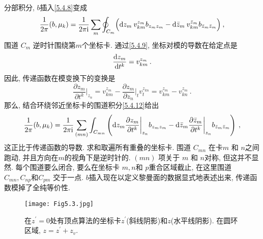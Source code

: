 分部积分, $b$插入\eqref{5.4.8}变成
\begin{equation}
	\frac{1}{2 \pi}(b, \mu_{k})=\frac{1}{2 \pi \mathrm{i}} \sum_{m} \oint_{C_{m}}\Bigl(\mathrm{d} z_{m} \: v_{k m}^{z_{m}} b_{z_{m} z_{m}}-\mathrm{d} \bar{z}_{m}\: v_{k m}^{\bar{z}_{m}} b_{\bar{z}_{m} \bar{z}_{m}}\Bigr) \:, \label{5.4.12}
\end{equation}
围道 $C_{m}$ 逆时针围绕第$m$个坐标卡. 通过\eqref{5.4.9}, 坐标对模的导数在给定点是
\begin{equation}
	\frac{\mathrm{d} z_{m}}{\mathrm{d} t^{k}}=v_{k m}^{z_{m}} \:. \label{5.4.13}
\end{equation}
因此, 传递函数在模变换下的变换是
\begin{equation}
	\frac{\partial z_{m}}{\partial t^{k}}\biggr|_{z_{n}}=v_{k m}^{z_{m}}-\frac{\partial z_{m}}{\partial z_{n}}\biggr\vert_{t} v_{t}^{z_{k n}}=v_{k m}^{z_{m}}-v_{k n}^{z_{m}} \:. \label{5.4.14}
\end{equation}
那么, 结合环绕邻近坐标卡的围道积分\eqref{5.4.12}给出
\begin{equation}
	\frac{1}{2 \pi}(b, \mu_{k}) = \frac{1}{2 \pi \mathrm{i}} \sum_{(m n)} \int_{C_{m n}}
	\left( \mathrm{d} z_{m} \frac{\partial z_{m}}{\partial t^{k}}\biggr\vert_{z_{n}} b_{z_{m} z_{m}}
	      -\mathrm{d} \bar{z}_{m} \frac{\partial \bar{z}_{m}}{\partial t^{k}}\biggr\vert_{z_{n}} b_{\bar{z}_{m} \bar{z}_{m}}\right)\:,
     \label{5.4.15}
\end{equation}
这正比于传递函数的导数. 求和取遍所有重叠的坐标卡. 围道 $C_{m n}$ 在卡$m$ 和 $n$之间跑动, 并且方向在$m$的视角下是逆时针的. 
$(m n)$ 项关于 $m$ 和 $n$对称, 但这并不显然. 每个围道要么闭合, 要么在坐标卡 $m, n$和 $p$重合区域截止, 
在这里围道 $C_{m n}, C_{n p}$和$C_{p m}$ 交于一点. $b$插入现在以定义黎曼面的数据显式地表述出来, 传递函数模掉了全纯等价性.

\begin{figure}
	\begin{center}
		\texttt{[image: Fig5.3.jpg]}\\
		\caption{在$z^{\prime}=0$处有顶点算法的坐标卡$z^{\prime}$(斜线阴影)和$z$(水平线阴影). 在圆环区域, $z=z^{\prime}+z_{v}$.}\label{fig:5.3}
	\end{center}
\end{figure}

